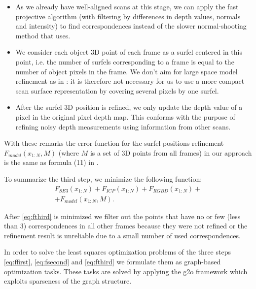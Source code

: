 \documentclass[letterpaper, 10 pt, conference]{ieeeconf}  %
\begin{document}
\begin{itemize}
 \item As we already have well-aligned scans at this stage, we can apply 
 the fast projective algorithm \cite{rusinkiewicz2001efficient} 
 (with filtering by differences in depth values, 
 normals and intensity) to find correspondences instead of the slower
 normal-shooting method that \cite{ruhnke2012highly} uses.
 \item We consider each object 3D point of each frame as 
 a surfel centered in this point, i.e. the number of surfels corresponding to a frame
 is equal to the number of object pixels in the frame. 
 We don't aim for large space model refinement as in \cite{ruhnke2012highly}:
 it is therefore not necessary for us to use a more compact scan surface representation by covering several pixels 
 by one surfel.
 \item After the surfel 3D position is refined, we only update the depth value 
 of a pixel in the original pixel depth map. This conforms with the purpose of
 refining noisy depth measurements using information from other scans.
\end{itemize}

With these remarks the error function for the surfel positions refinement 
$F_{model}(x_{1:N}, M)$ (where $M$ is a set of 3D points from 
all frames) in our approach is the same as formula (11) in \cite{ruhnke2012highly}.

To summarize the third step, we minimize the following function:
\begin{multline} \label{eq:fthird}
F_{SE3}(x_{1:N}) + F_{ICP}(x_{1:N}) + F_{RGBD}(x_{1:N}) + \\
+ F_{model}(x_{1:N}, M).
\end{multline}

After \eqref{eq:fthird} is minimized we filter out the points 
that have no or few (less than 3) correspondences in
all other frames because they were not refined or the refinement result
is unreliable due to a small number of used correspondences.

In order to solve the least squares optimization problems 
of the three steps \eqref{eq:ffirst}, \eqref{eq:fsecond} and \eqref{eq:fthird} 
we formulate them as graph-based optimization tasks.
These tasks are solved by applying the g2o framework 
\cite{kuemmerle2011g2o} which exploits sparseness of the graph structure.
\end{document}
